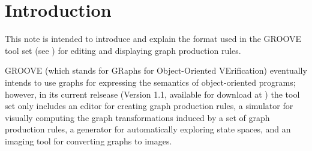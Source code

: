 \section{Introduction}

This note is intended to introduce and explain the format used in the GROOVE
tool set (see \cite{Rens03d}) for editing and displaying graph production rules.

GROOVE (which stands for GRaphs for Object-Oriented VErification) eventually
intends to use graphs for expressing the semantics of object-oriented programs;
however, in its current relsease (Version 1.1, available for download at
\URL{\grooveURL}) the tool set only includes an editor for creating graph
production rules, a simulator for visually computing the graph transformations
induced by a set of graph production rules, a generator for automatically exploring state
spaces, and an imaging tool for converting graphs to images.